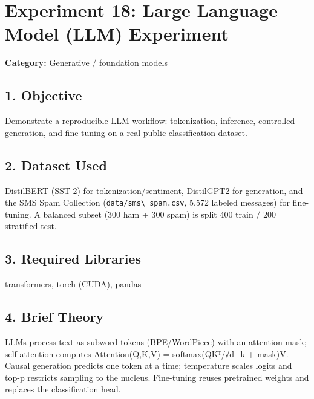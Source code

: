 
\chapter{Experiment 18: Large Language Model (LLM)
Experiment}\label{experiment-18-large-language-model-llm-experiment}

\textbf{Category:} Generative / foundation models

\section{1. Objective}\label{objective}

Demonstrate a reproducible LLM workflow: tokenization, inference,
controlled generation, and fine-tuning on a real public classification
dataset.

\section{2. Dataset Used}\label{dataset-used}

DistilBERT (SST-2) for tokenization/sentiment, DistilGPT2 for
generation, and the SMS Spam Collection
(\passthrough{\lstinline!data/sms\_spam.csv!}, 5,572 labeled messages)
for fine-tuning. A balanced subset (300 ham + 300 spam) is split 400
train / 200 stratified test.

\section{3. Required Libraries}\label{required-libraries}

transformers, torch (CUDA), pandas

\section{4. Brief Theory}\label{brief-theory}

LLMs process text as subword tokens (BPE/WordPiece) with an attention
mask; self-attention computes Attention(Q,K,V) = softmax(QKᵀ/√d\_k +
mask)V. Causal generation predicts one token at a time; temperature
scales logits and top-p restricts sampling to the nucleus. Fine-tuning
reuses pretrained weights and replaces the classification head.

